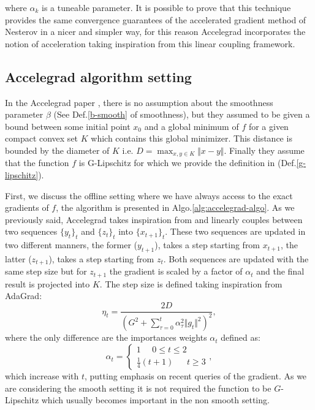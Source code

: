 \documentclass[12pt]{article}
\theoremstyle{definition}
\begin{document}
where $\alpha_k$ is a tuneable parameter.
It is possible to prove that this technique provides the same convergence guarantees of the accelerated gradient method of Nesterov in a nicer and simpler way, for this reason Accelegrad incorporates the notion of acceleration taking inspiration from this linear coupling framework.
  
\subsection{Accelegrad algorithm setting}

In the Accelegrad paper \cite{accelegrad}, there is no assumption about the smoothness parameter $\beta$ (See Def.\ref{b-smooth} of smoothness), but they assumed to be given a bound between some initial point $x_0$ and a global minimum of $f$ for a given compact convex set $K$ which contains this global minimizer. This distance is bounded by the diameter of $K$ i.e. $D = \max_{x,y \in K} \Vert x-y \Vert $. Finally they assume that the function $f$ is G-Lipschitz for which we provide the definition in (Def.\ref{g-lipschitz}).

First, we discuss the offline setting where we have always access to the exact gradients of $f$, the algorithm is presented in Algo.\ref{alg:accelegrad-algo}. As we previously said, Accelegrad takes inspiration from \cite{linearcup} and linearly couples between two sequences $\{y_t\}_t$ and $\{z_t\}_t$ into $\{x_{t+1}\}_t$. These two sequences are updated in two different manners, the former ($y_{t+1}$), takes a step starting from $x_{t+1}$, the latter ($z_{t+1}$), takes a step starting from $z_t$. Both sequences are updated with the same step size but for $z_{t+1}$ the gradient is scaled by a factor of $\alpha_t$ and the final result is projected into $K$. The step size is defined taking inspiration from AdaGrad:
\begin{equation}
  \eta_t = \frac{2D}{(G^2 + \sum_{\tau = 0}^t \alpha_{\tau}^2 \Vert g_t \Vert^2)^2},
\label{learning-1}
\end{equation}
where the only difference are the importances weights $\alpha_t$ defined as:
\begin{equation}
  \alpha_t = \begin{cases}
				1 \ \ \ \ \ \ 0 \leq t \leq 2\\
				\frac{1}{4}(t+1) \ \ \ \ \ \ \ t \geqslant 3
			 \end{cases},
\label{alpha}
\end{equation}
which increase with $t$, putting emphasis on recent queries of the gradient. As we are considering the smooth setting it is not required the function to be $G$-Lipschitz which usually becomes important in the non smooth setting.
\end{document}
